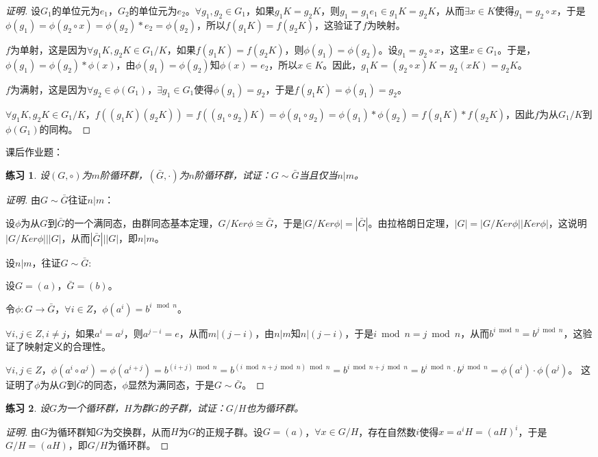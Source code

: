 \documentclass{article}
\newtheorem{Exercise}{练习}
\begin{document}
\begin{CJK*}{UTF8}{gbsn}
\begin{proof}[证明]
  设$G_1$的单位元为$e_1$，$G_2$的单位元为$e_2$。$\forall g_1,g_2\in G_1$，如果$g_1K=g_2K$，则$g_1=g_1e_1\in g_1K=g_2K$，从而$\exists x\in K$使得$g_1=g_2\circ x$，于是$\phi(g_1)=\phi(g_2\circ x)=\phi(g_2)*e_2=\phi(g_2)$，所以$f(g_1K)=f(g_2K)$，这验证了$f$为映射。
  
  $f$为单射，这是因为$\forall g_1K,g_2K\in G_1/K$，如果$f(g_1K)=f(g_2K)$，则$\phi(g_1)=\phi(g_2)$。设$g_1=g_2\circ x$，这里$x\in G_1$。于是，$\phi(g_1)=\phi(g_2)*\phi(x)$，由$\phi(g_1)=\phi(g_2)$知$\phi(x)=e_2$，所以$x\in K$。因此，$g_1K=(g_2\circ x)K=g_2(xK)=g_2K$。
  
  $f$为满射，这是因为$\forall g_2 \in \phi(G_1)$，$\exists g_1\in G_1$使得$\phi(g_1)=g_2$，于是$f(g_1K)=\phi(g_1)=g_2$。
  
  $\forall g_1K,g_2K\in G_1/K$，$f((g_1K)(g_2K))=f((g_1\circ g_2)K)=\phi(g_1\circ g_2)=\phi(g_1)*\phi(g_2)=f(g_1K)*f(g_2K)$，因此$f$为从$G_1/K$到$\phi(G_1)$的同构。
  \end{proof}
  

课后作业题：
\begin{Exercise}
设$(G,\circ)$为$m$阶循环群，$(\bar{G},\cdot)$为$n$阶循环群，试证：$G \sim \bar{G}$当且仅当$n | m$。
\end{Exercise}
\begin{proof}[证明]
由$G\sim \bar{G}$往证$n|m$：

设$\phi$为从$G$到$\bar{G}$的一个满同态，由群同态基本定理，$G/Ker \phi\cong \bar{G}$，于是$|G/Ker \phi|=|\bar{G}|$。由拉格朗日定理，$|G|=|G/Ker \phi||Ker \phi|$，这说明$|G/Ker \phi|||G|$，从而$|\bar{G}|||G|$，即$n|m$。

设$n|m$，往证$G\sim \bar{G}$:

设$G=(a)$，$\bar{G}=(b)$。

令$\phi:G\to \bar{G}$，$\forall i\in Z$，$\phi(a^i)=b^{i \mod n}$。

$\forall i,j\in Z, i\neq j$，如果$a^i=a^j$，则$a^{j-i}=e$，从而$m|(j-i)$，由$n|m$知$n|(j-i)$，于是$i\bmod n=j\bmod n$，从而$b^{i\bmod n}=b^{j\bmod n}$，这验证了映射定义的合理性。

$\forall i,j\in Z$，$\phi(a^i\circ a^j)=\phi(a^{i+j})=b^{(i+j) \bmod n} = b^{(i\bmod n+j\bmod n)\bmod n}=b^{i\bmod n+j\bmod n}=b^{i\bmod n}\cdot b^{j\bmod n}=\phi(a^i)\cdot \phi(a^j)$。 
这证明了$\phi$为从$G$到$\bar{G}$的同态，$\phi$显然为满同态，于是$G\sim \bar{G}$。
\end{proof}
\begin{Exercise}
设$G$为一个循环群，$H$为群$G$的子群，试证：$G/H$也为循环群。
\end{Exercise}
\begin{proof}[证明]
由$G$为循环群知$G$为交换群，从而$H$为$G$的正规子群。设$G=(a)$，$\forall x\in G/H$，存在自然数$i$使得$x=a^iH=(aH)^i$，于是$G/H=(aH)$，即$G/H$为循环群。
\end{proof}
\end{CJK*}
\end{document}
